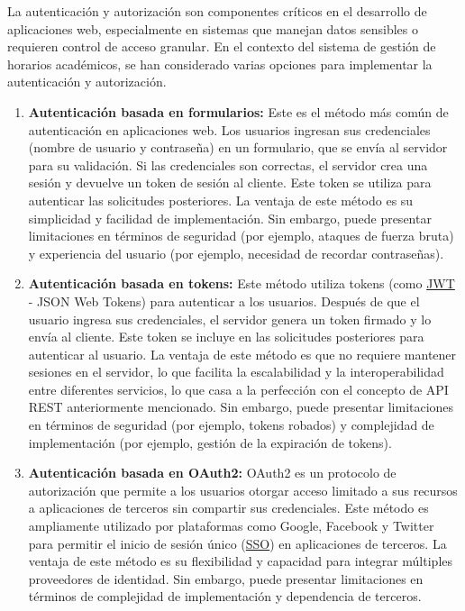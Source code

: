 La autenticación y autorización son componentes críticos en el desarrollo de aplicaciones web, especialmente en sistemas que manejan datos sensibles o requieren control de acceso granular. En el contexto del sistema de gestión de horarios académicos, se han considerado varias opciones para implementar la autenticación y autorización.
\begin{enumerate}
    \item \textbf{Autenticación basada en formularios:} Este es el método más común de autenticación en aplicaciones web. Los usuarios ingresan sus credenciales (nombre de usuario y contraseña) en un formulario, que se envía al servidor para su validación. Si las credenciales son correctas, el servidor crea una sesión y devuelve un token de sesión al cliente. Este token se utiliza para autenticar las solicitudes posteriores.\newline
        La ventaja de este método es su simplicidad y facilidad de implementación. Sin embargo, puede presentar limitaciones en términos de seguridad (por ejemplo, ataques de fuerza bruta) y experiencia del usuario (por ejemplo, necesidad de recordar contraseñas).
    \item \textbf{Autenticación basada en tokens:} Este método utiliza tokens (como \hyperlink{jwt}{JWT} - JSON Web Tokens) para autenticar a los usuarios. Después de que el usuario ingresa sus credenciales, el servidor genera un token firmado y lo envía al cliente. Este token se incluye en las solicitudes posteriores para autenticar al usuario. La ventaja de este método es que no requiere mantener sesiones en el servidor, lo que facilita la escalabilidad y la interoperabilidad entre diferentes servicios, lo que casa a la perfección con el concepto de API REST anteriormente mencionado.\newline
        Sin embargo, puede presentar limitaciones en términos de seguridad (por ejemplo, tokens robados) y complejidad de implementación (por ejemplo, gestión de la expiración de tokens).
    \item \textbf{Autenticación basada en OAuth2:} OAuth2 es un protocolo de autorización que permite a los usuarios otorgar acceso limitado a sus recursos a aplicaciones de terceros sin compartir sus credenciales. Este método es ampliamente utilizado por plataformas como Google, Facebook y Twitter para permitir el inicio de sesión único (\hyperlink{sso}{SSO}) en aplicaciones de terceros.\newline
        La ventaja de este método es su flexibilidad y capacidad para integrar múltiples proveedores de identidad. Sin embargo, puede presentar limitaciones en términos de complejidad de implementación y dependencia de terceros.

\end{enumerate}
